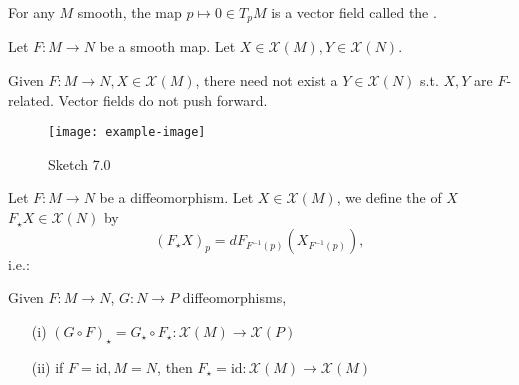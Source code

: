 \begin{example}
    For any \(M\) smooth, the map \(p\mapsto 0\in T_pM\) is a vector field called the .
\end{example}

Let \(F:M \to N\) be a smooth map. Let \(X\in\mathcal{X}(M),Y\in \mathcal{X}(N)\).


 Given \(F:M\to N, X\in\mathcal{X}(M)\), there need not exist a \(Y\in \mathcal{X}(N)\) s.t. 
\(X,Y\) are \(F\)-related. Vector fields do not push forward.
\begin{figure}[H]\label{fig:7.04}
    \centering
    \texttt{[image: example-image]}
    \caption{Sketch 7.0}
\end{figure}

\begin{definition*}
    Let \(F:M\to N\) be a diffeomorphism. Let \(X\in\mathcal{X}(M)\), we define 
    the  of \(X\) \(F_\star X\in \mathcal{X}(N)\)
    by \[(F_\star X)_p=dF_{F^{-1}(p)}(X_{F^{-1}(p)}),\]
    i.e.:
    \begin{center}
    \end{center}
\end{definition*}

\begin{lemma}\label{7.2}
    Given \(F:M\to N\), \(G:N\to P\) diffeomorphisms, 
    \begin{enumerate}
        \item[(i)] \((G\circ F)_\star=G_\star\circ F_\star: \mathcal{X}(M)\to \mathcal{X}(P)\)
        \item[(ii)] if \(F=\text{id},M=N\), then \(F_\star=\text{id}:\mathcal{X}(M)\to \mathcal{X}(M)\)  
    \end{enumerate}
\end{lemma}

